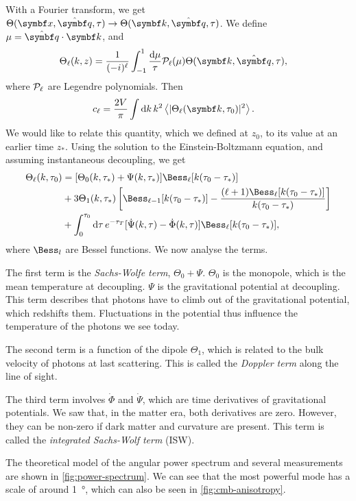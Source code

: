 With a Fourier transform, we get $\Theta(\vec{x}, \uvec{q}, \tau) \to \Theta(\vec{k}, \uvec{q}, \tau)$.
We define $\mu = \uvec{q} \cdot \vec{k}$, and
\begin{align*}
	\Theta_\ell(k, z)
	&= \frac{1}{(-i)^\ell}
	\int_{-1}^1 \frac{\dd{\mu}}{\tau} \Leg_\ell(\mu) \Theta(\vec{k}, \uvec{q}, \tau),
\end{align*}
where $\mathcal{P}_\ell$ are Legendre polynomials. Then
\begin{align*}
	c_\ell
	&= \frac{2 V}{\pi} \int \dd{k} k^2 \avg{\abs{\Theta_\ell(\vec{k}, \tau_0)}^2}.
\end{align*}
We would like to relate this quantity, which we defined at $z_0$, to its value at an earlier time $z_*$. Using the solution to the Einstein-Boltzmann equation, and assuming instantaneous decoupling, we get
\begin{align*}
	\Theta_\ell(k, \tau_0)
	&= [\Theta_0(k, \tau_*) + \Psi(k, \tau_*)]
	\Bess_\ell [k(\tau_0 - \tau_*)]\\
	&+ 3 \Theta_1(k, \tau_*) 
	\left[ \Bess_{\ell-1} [k(\tau_0-\tau_*)]
	- \frac{(\ell+1) \Bess_\ell[k(\tau_0-\tau_*)]}{k (\tau_0-\tau_*)}
	\right]\\
	&+ \int_0^{\tau_0} \dd{\tau} e^{-\tau_T}
	[\dot{\Psi}(k,\tau) - \dot{\Phi}(k, \tau)]
	\Bess_\ell [k(\tau_0-\tau_*)]
	,
\end{align*}
where $\Bess_l$ are Bessel functions. We now analyse the terms.

The first term is the \emph{Sachs-Wolfe term}, $\Theta_0 + \Psi$. $\Theta_0$ is the monopole, which is the mean temperature at decoupling. $\Psi$ is the gravitational potential at decoupling. This term describes that photons have to climb out of the gravitational potential, which redshifts them. Fluctuations in the potential thus influence the temperature of the photons we see today.

The second term is a function of the dipole $\Theta_1$, which is related to the bulk velocity of photons at last scattering. This is called the \emph{Doppler term} along the line of sight.

The third term involves $\dot{\Phi}$ and $\dot{\Psi}$, which are time derivatives of gravitational potentials. We saw that, in the matter era, both derivatives are zero. However, they can be non-zero if dark matter and curvature are present. This term is called the \emph{integrated Sachs-Wolf term} (ISW).

The theoretical model of the angular power spectrum and several measurements are shown in \cref{fig:power-spectrum}. We can see that the most powerful mode has a scale of around \SI{1}{\degree}, which can also be seen in \cref{fig:cmb-anisotropy}.

